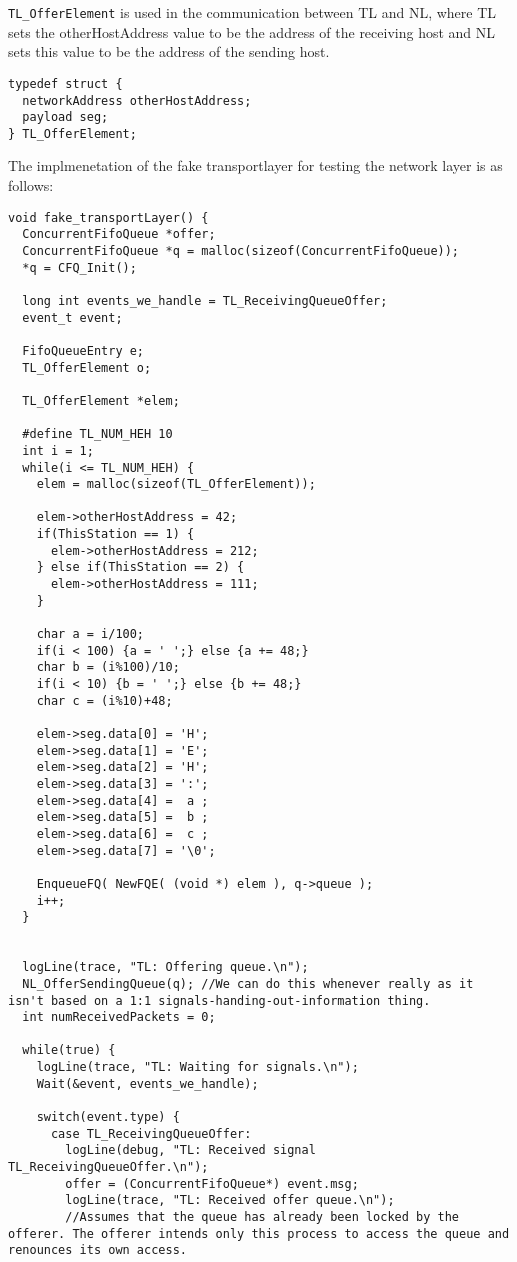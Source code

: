 \texttt{TL\_OfferElement} is used in the communication between TL and NL, where TL sets the otherHostAddress value to be the address of the receiving host and NL sets this value to be the address of the sending host.
\begin{lstlisting}
typedef struct {
  networkAddress otherHostAddress;
  payload seg;
} TL_OfferElement;
\end{lstlisting}

The implmenetation of the fake transportlayer for testing the network layer is as follows:

\begin{lstlisting}
void fake_transportLayer() {
  ConcurrentFifoQueue *offer;
  ConcurrentFifoQueue *q = malloc(sizeof(ConcurrentFifoQueue));
  *q = CFQ_Init();

  long int events_we_handle = TL_ReceivingQueueOffer;
  event_t event;

  FifoQueueEntry e;
  TL_OfferElement o;

  TL_OfferElement *elem;

  #define TL_NUM_HEH 10
  int i = 1;
  while(i <= TL_NUM_HEH) {
    elem = malloc(sizeof(TL_OfferElement));

    elem->otherHostAddress = 42;
    if(ThisStation == 1) {
      elem->otherHostAddress = 212;
    } else if(ThisStation == 2) {
      elem->otherHostAddress = 111;
    }

    char a = i/100;
    if(i < 100) {a = ' ';} else {a += 48;}
    char b = (i%100)/10;
    if(i < 10) {b = ' ';} else {b += 48;}
    char c = (i%10)+48;

    elem->seg.data[0] = 'H';
    elem->seg.data[1] = 'E';
    elem->seg.data[2] = 'H';
    elem->seg.data[3] = ':';
    elem->seg.data[4] =  a ;
    elem->seg.data[5] =  b ;
    elem->seg.data[6] =  c ;
    elem->seg.data[7] = '\0';

    EnqueueFQ( NewFQE( (void *) elem ), q->queue );
    i++;
  }


  logLine(trace, "TL: Offering queue.\n");
  NL_OfferSendingQueue(q); //We can do this whenever really as it isn't based on a 1:1 signals-handing-out-information thing.
  int numReceivedPackets = 0;

  while(true) {
    logLine(trace, "TL: Waiting for signals.\n");
    Wait(&event, events_we_handle);

    switch(event.type) {
      case TL_ReceivingQueueOffer:
        logLine(debug, "TL: Received signal TL_ReceivingQueueOffer.\n");
        offer = (ConcurrentFifoQueue*) event.msg;
        logLine(trace, "TL: Received offer queue.\n");
        //Assumes that the queue has already been locked by the offerer. The offerer intends only this process to access the queue and renounces its own access.


\end{lstlisting}
